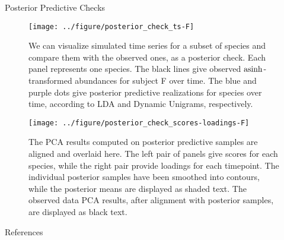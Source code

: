 \documentclass[final]{beamer}
\newlength{\onecolwid}
\begin{document}
\begin{frame}
\begin{columns}
\begin{column}{\onecolwid}
\begin{block}{Posterior Predictive Checks}
\end{block}

\begin{figure}[!p]
  \centering
  \texttt{[image: ../figure/posterior\_check\_ts-F]}
  \caption{We can visualize simulated time series for a subset of species and
    compare them with the observed ones, as a posterior check. Each panel
    represents one species. The black lines give observed $\mathop\mathrm{asinh}$-transformed
    abundances for subject F over time. The blue and purple dots give posterior
    predictive realizations for species over time, according to LDA and Dynamic
    Unigrams, respectively.
    \label{fig:antibiotics_posterior_ts}}
\end{figure}

\begin{figure}[!p]
  \centering
  \texttt{[image: ../figure/posterior\_check\_scores-loadings-F]}
  \caption{
    The PCA results computed on posterior predictive samples are aligned and
    overlaid here. The left pair of panels give scores for each species, while
    the right pair provide loadings for each timepoint. The individual posterior
    samples have been smoothed into contours, while the posterior means are
    displayed as shaded text. The observed data PCA results, after alignment
    with posterior samples, are displayed as black
    text. \label{fig:antibiotics_posterior_pca} }
\end{figure}


\begin{block}{References}


\end{block}

\end{column}
\end{columns}


\end{frame}
\end{document}
